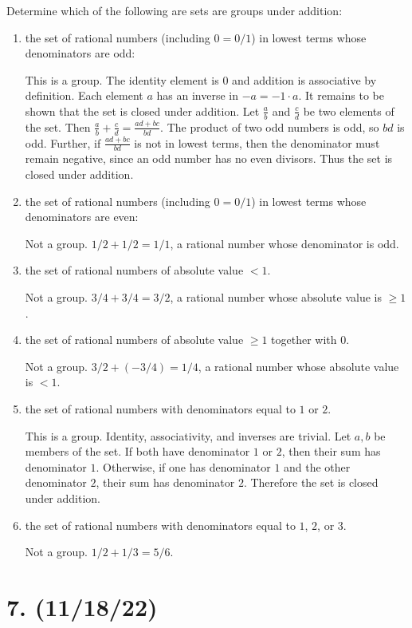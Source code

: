 \documentclass{article}
\begin{document}
Determine which of the following are sets are groups under addition:

\begin{enumerate}[label=(\alph*)]
      \item the set of rational numbers (including $0 = 0/1$) in lowest terms whose denominators are odd:
      
            This is a group. The identity element is $0$ and addition is associative by definition. Each element $a$ has an inverse in $-a = -1 \cdot a$. It remains to be shown that the set is closed under addition. Let $\frac{a}{b}$ and $\frac{c}{d}$ be two elements of the set. Then $\frac{a}{b} + \frac{c}{d} = \frac{ad + bc}{bd}$. The product of two odd numbers is odd, so $bd$ is odd. Further, if $\frac{ad + bc}{bd}$ is not in lowest terms, then the denominator must remain negative, since an odd number has no even divisors. Thus the set is closed under addition.
      \item the set of rational numbers (including $0 = 0/1$) in lowest terms whose denominators are even:

            Not a group. $1/2 + 1/2 = 1/1$, a rational number whose denominator is odd.
      \item the set of rational numbers of absolute value $< 1$.

            Not a group. $3/4 + 3/4 = 3/2$, a rational number whose absolute value is $\geq 1$.
      \item the set of rational numbers of absolute value $\geq 1$ together with $0$.

            Not a group. $3/2 + (-3/4) = 1/4$, a rational number whose absolute value is $< 1$. 
      \item the set of rational numbers with denominators equal to $1$ or $2$.

            This is a group. Identity, associativity, and inverses are trivial. Let $a, b$ be members of the set. If both have denominator $1$ or $2$, then their sum has denominator $1$. Otherwise, if one has denominator $1$ and the other denominator $2$, their sum has denominator $2$. Therefore the set is closed under addition.
      \item the set of rational numbers with denominators equal to $1$, $2$, or $3$.

            Not a group. $1/2 + 1/3 = 5/6$.
\end{enumerate}

\section*{7. (11/18/22)}
\end{document}
